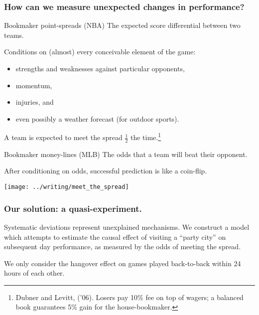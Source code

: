 \documentclass{beamer}
\begin{document}
\begin{frame}
  \frametitle{How can we measure unexpected changes in performance?}     \begin{block}{Bookmaker point-spreads (NBA)}     
    The expected score differential between two teams.

    Conditions on (almost) every conceivable element of the game:
    \begin{itemize}     \item strengths and weaknesses against particular opponents,
    \item momentum,
    \item injuries, and
    \item even possibly a weather forecast (for outdoor sports).     \end{itemize}

    A team is expected to meet the spread $\frac{1}{2}$ the time.\footnote{Dubner and Levitt, ('06). Losers pay 10\% fee on top of wagers; a balanced book guarantees 5\% gain for the house-bookmaker.}
  \end{block}
  \vspace{12pt}\begin{block}{Bookmaker money-lines (MLB)}     The odds that a team will beat their opponent.

    After conditioning on odds, successful prediction is like a coin-flip. \end{block} \end{frame}

\begin{frame}
  \centering   \texttt{[image: ../writing/meet\_the\_spread]} 
\end{frame}

\begin{frame}   \frametitle{Our solution: a quasi-experiment.}
  \begin{block}{Systematic deviations represent unexplained mechanisms.}     We construct a model which attempts to estimate the causal effect of visiting a ``party city''
    on subsequent day performance, as measured by the odds of meeting the spread.       \end{block}

  \begin{block}{}     We only consider the hangover effect on games played back-to-back within 24 hours of each other.   \end{block} \end{frame}
\end{document}
